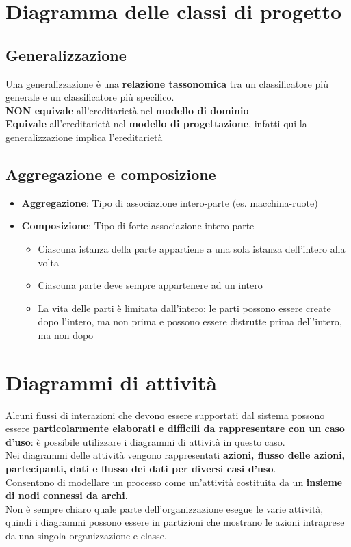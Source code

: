 \documentclass[12pt]{article}
\begin{document}
\section{Diagramma delle classi di progetto}
\subsection{Generalizzazione}
Una generalizzazione è una \textbf{relazione tassonomica} tra un classificatore più generale e un classificatore più specifico. 
\\\textbf{NON equivale} all'ereditarietà nel \textbf{modello di dominio}
\\\textbf{Equivale} all'ereditarietà nel \textbf{modello di progettazione}, infatti qui la generalizzazione implica l'ereditarietà

\subsection{Aggregazione e composizione}
\begin{itemize}
    \item \textbf{Aggregazione}: Tipo di associazione intero-parte (es. macchina-ruote)
    \item \textbf{Composizione}: Tipo di forte associazione intero-parte
    \begin{itemize}
        \item Ciascuna istanza della parte appartiene a una sola istanza dell'intero alla volta
        \item Ciascuna parte deve sempre appartenere ad un intero
        \item La vita delle parti è limitata dall'intero: le parti possono essere create dopo l'intero, ma non prima e possono essere distrutte prima dell'intero, ma non dopo
    \end{itemize}
\end{itemize}
\newpage
\section{Diagrammi di attività}
Alcuni flussi di interazioni che devono essere supportati dal sistema possono essere \textbf{particolarmente elaborati e difficili da rappresentare con un caso d’uso}: è possibile utilizzare i diagrammi di attività in questo caso. \\[12pt]Nei diagrammi delle attività vengono rappresentati \textbf{azioni, flusso delle azioni, partecipanti, dati e flusso dei dati per diversi casi d’uso}. \\[12pt]Consentono di modellare un processo come un’attività costituita da un \textbf{insieme di nodi connessi da archi}. \\[12pt]Non è sempre chiaro quale parte dell’organizzazione esegue le varie attività, quindi i diagrammi possono essere in partizioni che mostrano le azioni intraprese da una singola organizzazione e classe.
\newpage
\end{document}
